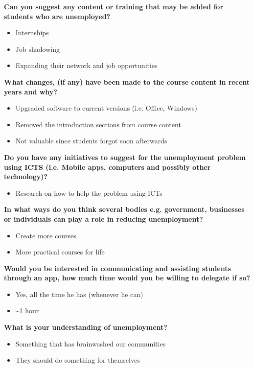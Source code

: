\noindent\textbf{Can you suggest any content or training that may be added for students who are unemployed?}
\begin{itemize}
\item Internships
\item Job shadowing
\item Expanding their network and job opportunities
\end{itemize}

\noindent\textbf{What changes, (if any) have been made to the course content in recent years and why?}
\begin{itemize}
\item Upgraded software to current versions (i.e. Office, Windows)
\item Removed the introduction sections from course content
\item Not valuable since students forgot soon afterwards
\end{itemize}



\noindent\textbf{Do you have any initiatives to suggest for the unemployment problem using ICTS (i.e. Mobile apps, computers and possibly other technology)?}
\begin{itemize}
\item Research on how to help the problem using ICTs
\end{itemize}

\noindent\textbf{In what ways do you think several bodies e.g. government, businesses or individuals can play a role in reducing unemployment?}
\begin{itemize}
\item Create more courses
\item More practical courses for life
\end{itemize}

\noindent\textbf{Would you be interested in communicating and assisting students through an app, how much time would you be willing to delegate if so?}
\begin{itemize}
\item Yes, all the time he has (whenever he can)
\item \textasciitilde 1 hour
\end{itemize}

\noindent\textbf{What is your understanding of unemployment?}
\begin{itemize}
\item Something that has brainwashed our communities
\item They should do something for themselves
\end{itemize}

